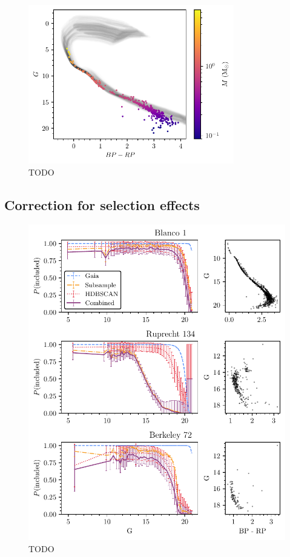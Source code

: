 \begin{figure}[t]
    \centering
    \includegraphics[width=0.8\textwidth]{fig/c4/masses_stellar.pdf}
    \caption[TODO]{TODO}
    \label{fig:dynamics:masses:stellar_masses}
 \end{figure}


\subsection{Correction for selection effects}
\label{sec:dynamics:masses:selection}

\begin{figure}[p]
    \centering
    \includegraphics[width=\textwidth]{fig/c4/mass_selection_functions.pdf}
    \caption[TODO]{TODO}
    \label{fig:dynamics:masses:selection_effects}
 \end{figure}


